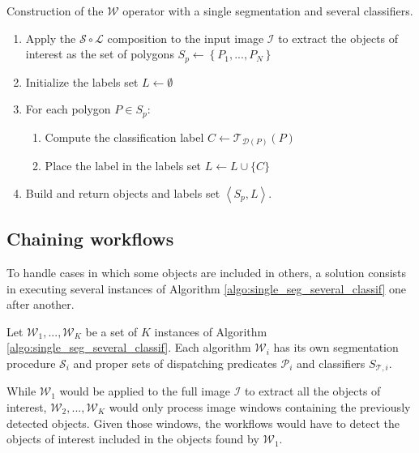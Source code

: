 \begin{algorithm}\label{algo:single_seg_several_classif}
Construction of the $\mathcal{W}$ operator with a single segmentation and several classifiers. 
\begin{enumerate}
	\item Apply the $\mathcal{S} \circ \mathcal{L}$ composition to the input image $\mathcal{I}$ to extract the objects of interest as the set of polygons $S_p \leftarrow \left\{P_1, ..., P_N \right\}$
	\item Initialize the labels set $L \leftarrow \emptyset$
	\item For each polygon $P \in S_p$:
	\begin{enumerate}
		\item Compute the classification label $C \leftarrow \mathcal{T}_{\mathcal{D}(P)}(P)$
		\item Place the label in the labels set $L \leftarrow L \cup \{C\}$
	\end{enumerate}
	\item Build and return objects and labels set $\left\langle S_p , L\right\rangle$.
\end{enumerate}
\end{algorithm}

\subsection{Chaining workflows}

To handle cases in which some objects are included in others, a solution consists in executing several instances of Algorithm \ref{algo:single_seg_several_classif} one after another. 

\begin{definition}\label{def:several_w_op}
	Let $\mathcal{W}_1, ..., \mathcal{W}_K$ be a set of $K$ instances of Algorithm \ref{algo:single_seg_several_classif}. Each algorithm $\mathcal{W}_i$ has its own segmentation procedure $\mathcal{S}_i$ and proper sets of dispatching predicates $\mathcal{P}_i$ and classifiers $S_{\mathcal{T},i}$.
\end{definition}

While $\mathcal{W}_1$ would be applied to the full image $\mathcal{I}$ to extract all the objects of interest, $\mathcal{W}_2, ..., \mathcal{W}_K$ would only process image windows containing the previously detected objects. Given those windows, the workflows would have to detect the objects of interest included in the objects found by $\mathcal{W}_1$. 

